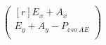 \documentclass[12pt,a4paper]{article}
\begin{document}
\begin{landscape}
	\begin{center}
	\begin{equation*}
		\begin{pmatrix*}[r]
			E_{x}+A_{x}\\
			E_{y}+A_{y}-P_{eso~AE}\\

\end{pmatrix*}
\end{equation*}
\end{center}
\end{landscape}
\end{document}
